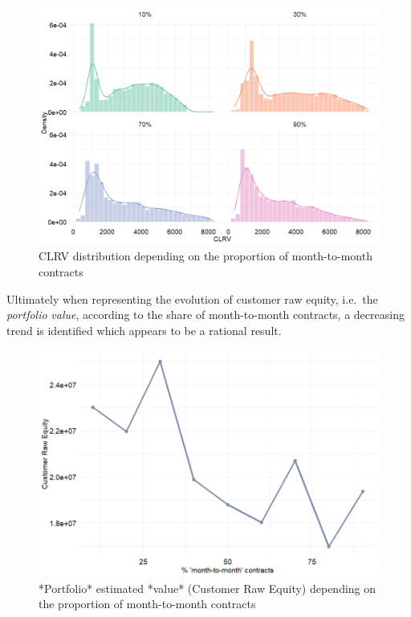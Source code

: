 \documentclass[
]{book}
\begin{document}
\begin{figure}

{\centering \includegraphics[width=13.89in]{./imgs/clrv_month_to_month} 

}

\caption{CLRV distribution depending on the proportion of month-to-month contracts}\label{fig:clrvmonthtomonth}
\end{figure}

Ultimately when representing the evolution of customer raw equity, i.e.~the \emph{portfolio} \emph{value}, according to the share of month-to-month contracts, a decreasing trend is identified which appears to be a rational result.

\begin{figure}

{\centering \includegraphics[width=12.5in]{./imgs/portVal_month_to_month} 

}

\caption{*Portfolio* estimated *value* (Customer Raw Equity) depending on the proportion of month-to-month contracts}\label{fig:clrvmonthtomonthEvol}
\end{figure}
\end{document}
